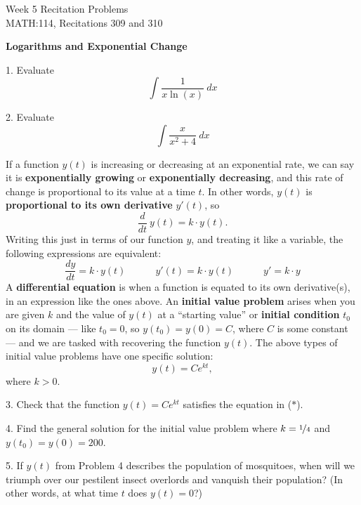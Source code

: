 \documentclass[11pt]{article}
\begin{document}
	{
		\centering
		\huge{Week 5 Recitation Problems} \\
		\Large{MATH:114, Recitations 309 and 310} \\
	}
	\vspace{3em}
	
	{
		\centering
		\large{\textbf{Logarithms and Exponential Change}} \\
	}
	\vspace{3em}
	
	1. Evaluate $$ \int \frac{1}{x \ln(x)} \ dx $$ 
	
	\vspace{0.3\textheight}
	2. Evaluate $$ \int \frac{x}{x^2+4} \ dx $$
	
	\newpage
	If a function $y(t)$ is increasing or decreasing at an exponential rate, we can say it is \textbf{exponentially growing} or \textbf{exponentially decreasing}, and this rate of change is proportional to its value at a time $t$. In other words, $y(t)$ is \textbf{proportional to its own derivative} $y'(t)$, so \begin{equation*} \frac{d}{dt} \ y(t) = k \cdot y(t). \tag{$\ast$}\end{equation*} Writing this just in terms of our function $y$, and treating it like a variable, the following expressions are equivalent: $$ \frac{dy}{dt} = k \cdot y(t) \hspace{3em} y'(t) = k \cdot y(t) \hspace{3em}  y' = k\cdot y$$
	A \textbf{differential equation} is when a function is equated to its own derivative(s), in an expression like the ones above. An \textbf{initial value problem} arises when you are given $k$ and the value of $y(t)$ at a ``starting value'' or \textbf{initial condition} $t_0$ on its domain --- like $t_0=0$, so $y(t_0) = y(0) = C$, where $C$ is some constant --- and we are tasked with recovering the function $y(t)$. The above types of initial value problems have one specific solution: $$ y(t) = Ce^{kt}, $$ where $k>0$. 
	
	\vspace{3em}
	3. Check that the function $y(t) = Ce^{kt}$ satisfies the equation in ($\ast$).
	
	\vspace{0.1\textheight}
	4. Find the general solution for the initial value problem where $k=\nicefrac 14$ and $y(t_0) = y(0) = 200$.
	
	\vspace{0.2\textheight}
	5. If $y(t)$ from Problem 4 describes the population of mosquitoes, when will we triumph over our pestilent insect overlords and vanquish their population? (In other words, at what time $t$ does $y(t) = 0$?)	
\end{document}
